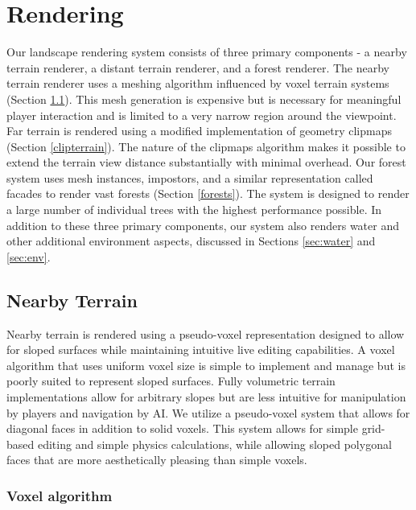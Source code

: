 
\chapter{Rendering} \label{rendering}

Our landscape rendering system consists of three primary components - a nearby terrain renderer, a distant terrain renderer, and a forest renderer.
The nearby terrain renderer uses a meshing algorithm influenced by voxel terrain systems (Section \ref{voxterrain}).
This mesh generation is expensive but is necessary for meaningful player interaction and is limited to a very narrow region around the viewpoint.
Far terrain is rendered using a modified implementation of geometry clipmaps (Section \ref{clipterrain}).
The nature of the clipmaps algorithm makes it possible to extend the terrain view distance substantially with minimal overhead.
Our forest system uses mesh instances, impostors, and a similar representation called facades to render vast forests (Section \ref{forests}).
The system is designed to render a large number of individual trees with the highest performance possible.
In addition to these three primary components, our system also renders water and other additional environment aspects, discussed in Sections \ref{sec:water} and \ref{sec:env}.

\section{Nearby Terrain} \label{voxterrain} %

Nearby terrain is rendered using a pseudo-voxel representation designed to allow for sloped surfaces while maintaining intuitive live editing capabilities.
A voxel algorithm that uses uniform voxel size is simple to implement and manage but is poorly suited to represent sloped surfaces.
Fully volumetric terrain implementations allow for arbitrary slopes but are less intuitive for manipulation by players and navigation by AI.
We utilize a pseudo-voxel system that allows for diagonal faces in addition to solid voxels.
This system allows for simple grid-based editing and simple physics calculations, while allowing sloped polygonal faces that are more aesthetically pleasing than simple voxels.

\subsection{Voxel algorithm}

